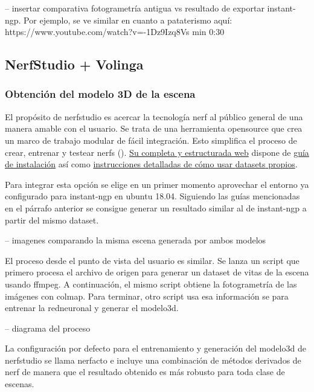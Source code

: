 \documentclass[a4paper, 12pt, spanish, twoside]{article}
\begin{document}
-- insertar comparativa fotogrametría antigua vs resultado de exportar instant-ngp. Por ejemplo, se ve similar en cuanto a pataterismo aquí: https://www.youtube.com/watch?v=-1Dz9Izq8Vs min 0:30  

\subsection{NerfStudio + Volinga} \label{sec:implementacion:nerfstudio-volinga}

\subsubsection{Obtención del modelo 3D de la escena} \label{sec:implementacion:nerfstudio-volinga:obtencion}

El propósito de \gls{nerfstudio} es acercar la tecnología \acrshort{nerf} al público general de una manera amable con el usuario. Se trata de una herramienta \gls{opensource} que crea un marco de trabajo modular de fácil integración. Esto simplifica el proceso de crear, entrenar y testear \acrshort{nerf}s (\cite{nerfstudio}). \href{https://docs.nerf.studio/index.html}{Su completa y estructurada web} dispone de \href{https://docs.nerf.studio/quickstart/installation.html}{guía de instalación} así como \href{https://docs.nerf.studio/quickstart/custom_dataset.html}{instrucciones detalladas de cómo usar \glspl{dataset} propios}.  

Para integrar esta opción se elige en un primer momento aprovechar el entorno ya configurado para \gls{instant-ngp} en \gls{ubuntu} 18.04. Siguiendo las guías mencionadas en el párrafo anterior se consigue generar un resultado similar al de \gls{instant-ngp} a partir del mismo \gls{dataset}. 

-- imagenes comparando la misma escena generada por ambos modelos 

El proceso desde el punto de vista del usuario es similar. Se lanza un \gls{script} que primero procesa el archivo de origen para generar un \gls{dataset} de vitas de la escena usando \gls{ffmpeg}. A continuación, el mismo \gls{script} obtiene la fotogrametría de las imágenes con \gls{colmap}. Para terminar, otro \gls{script} usa esa información se para entrenar la \gls{redneuronal} y generar el \gls{modelo3d}.  

-- diagrama del proceso 

La configuración por defecto para el entrenamiento y generación del \gls{modelo3d} de \gls{nerfstudio} se llama \gls{nerfacto} e incluye una combinación de métodos derivados de \acrshort{nerf} de manera que el resultado obtenido es más robusto para toda clase de escenas. 
\end{document}
